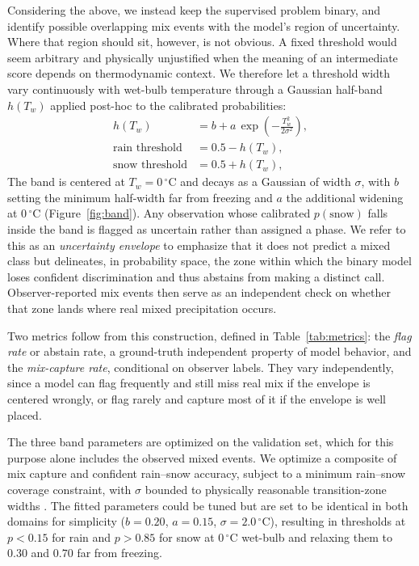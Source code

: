 \documentclass[twocol]{ametsocV6.1} %
\newcommand{\degC}[1]{\ensuremath{#1\,^{\circ}\mathrm{C}}}
\begin{document}
Considering the above, we instead keep the supervised problem binary, and identify 
possible overlapping mix events with the model's region of uncertainty. 
Where that region should sit, however, is not obvious. A fixed threshold 
would seem arbitrary and physically unjustified when the 
meaning of an intermediate score depends on thermodynamic context. 
We therefore let a threshold width vary continuously with wet-bulb
temperature through a Gaussian half-band $h(T_w)$ applied post-hoc to the
calibrated probabilities:
\begin{equation}
  \begin{aligned}
    h(T_w) &= b + a\,\exp\!\left(-\frac{T_w^2}{2\sigma^2}\right),\\
    \text{rain threshold} &= 0.5 - h(T_w),\\
    \text{snow threshold} &= 0.5 + h(T_w),
  \end{aligned}
  \label{eq:band}
\end{equation}
The band is centered at $T_w = \degC{0}$ and decays as a Gaussian of
width $\sigma$, with $b$ setting the minimum half-width far from
freezing and $a$ the additional widening at \degC{0}
(Figure~\ref{fig:band}). Any observation whose calibrated
$p(\mathrm{snow})$ falls inside the band is flagged as uncertain rather
than assigned a phase. We refer to this as an \emph{uncertainty envelope} to
emphasize that it does not predict a mixed class but delineates, in
probability space, the zone within which the binary model loses
confident discrimination and thus abstains from making a distinct call.
Observer-reported mix events then serve as an independent check on
whether that zone lands where real mixed precipitation occurs.

Two metrics follow from this construction, defined in
Table~\ref{tab:metrics}: the \emph{flag rate} or abstain rate, a
ground-truth independent property of model behavior, and the
\emph{mix-capture rate}, conditional on observer labels. They vary
independently, since a model can flag frequently and still miss real mix
if the envelope is centered wrongly, or flag rarely and capture most of
it if the envelope is well placed.

The three band parameters are optimized on the validation set, which
for this purpose alone includes the observed mixed events. We optimize
a composite of mix capture and confident rain--snow accuracy, subject
to a minimum rain--snow coverage constraint, with $\sigma$ bounded to
physically reasonable transition-zone widths \citep{sims2015,
jennings2025}. The fitted parameters could be tuned but are set to be 
identical in both domains for simplicity ($b = 0.20$, $a = 0.15$, $\sigma = \degC{2.0}$), 
resulting in thresholds at $p < 0.15$ for rain and $p > 0.85$ for snow at \degC{0} wet-bulb and
relaxing them to $0.30$ and $0.70$ far from freezing.
\end{document}
